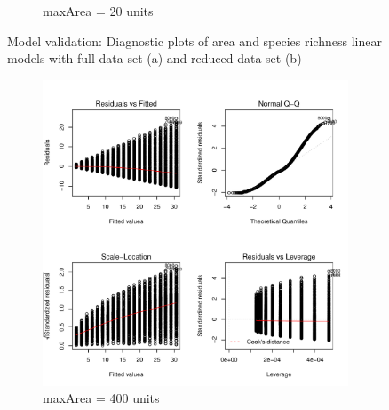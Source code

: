 \documentclass{article}
\begin{document}
\begin{figure}[h!]
\begin{subfigure}[b]{0.4\linewidth}
    \caption{maxArea = 20 units}
  \end{subfigure}
  \caption{Model validation: Diagnostic plots of area and species richness linear models with full data set (a) and reduced data set (b)}
  \label{fig:Model validation area/species LM}
\end{figure}\bigskip

\begin{figure}[h!]
  \centering
  \begin{subfigure}[b]{0.4\linewidth}
    \includegraphics[width=\linewidth]{../../../Results/Simulation2/NicheSpeciesLmPlot_1.pdf}
    \caption{maxArea = 400 units}
  \end{subfigure}
  \begin{subfigure}[b]{0.4\linewidth}

\end{subfigure}
\end{figure}
\end{document}
